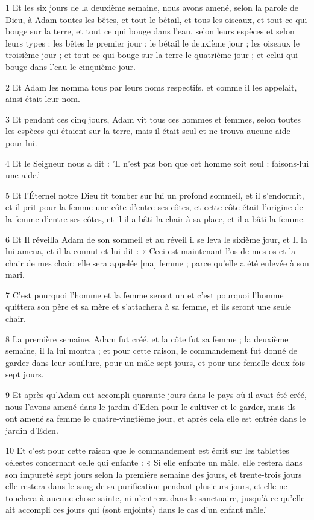 \par 1 Et les six jours de la deuxième semaine, nous avons amené, selon la parole de Dieu, à Adam toutes les bêtes, et tout le bétail, et tous les oiseaux, et tout ce qui bouge sur la terre, et tout ce qui bouge dans l'eau, selon leurs espèces et selon leurs types : les bêtes le premier jour ; le bétail le deuxième jour ; les oiseaux le troisième jour ; et tout ce qui bouge sur la terre le quatrième jour ; et celui qui bouge dans l'eau le cinquième jour.
\par 2 Et Adam les nomma tous par leurs noms respectifs, et comme il les appelait, ainsi était leur nom.
\par 3 Et pendant ces cinq jours, Adam vit tous ces hommes et femmes, selon toutes les espèces qui étaient sur la terre, mais il était seul et ne trouva aucune aide pour lui.
\par 4 Et le Seigneur nous a dit : 'Il n'est pas bon que cet homme soit seul : faisons-lui une aide.'
\par 5 Et l'Éternel notre Dieu fit tomber sur lui un profond sommeil, et il s'endormit, et il prit pour la femme une côte d'entre ses côtes, et cette côte était l'origine de la femme d'entre ses côtes, et il il a bâti la chair à sa place, et il a bâti la femme.
\par 6 Et Il réveilla Adam de son sommeil et au réveil il se leva le sixième jour, et Il la lui amena, et il la connut et lui dit : « Ceci est maintenant l'os de mes os et la chair de mes chair; elle sera appelée [ma] femme ; parce qu'elle a été enlevée à son mari.
\par 7 C'est pourquoi l'homme et la femme seront un et c'est pourquoi l'homme quittera son père et sa mère et s'attachera à sa femme, et ils seront une seule chair.
\par 8 La première semaine, Adam fut créé, et la côte fut sa femme ; la deuxième semaine, il la lui montra ; et pour cette raison, le commandement fut donné de garder dans leur souillure, pour un mâle sept jours, et pour une femelle deux fois sept jours.
\par 9 Et après qu'Adam eut accompli quarante jours dans le pays où il avait été créé, nous l'avons amené dans le jardin d'Eden pour le cultiver et le garder, mais ils ont amené sa femme le quatre-vingtième jour, et après cela elle est entrée dans le jardin d'Eden.
\par 10 Et c'est pour cette raison que le commandement est écrit sur les tablettes célestes concernant celle qui enfante : « Si elle enfante un mâle, elle restera dans son impureté sept jours selon la première semaine des jours, et trente-trois jours elle restera dans le sang de sa purification pendant plusieurs jours, et elle ne touchera à aucune chose sainte, ni n'entrera dans le sanctuaire, jusqu'à ce qu'elle ait accompli ces jours qui (sont enjoints) dans le cas d'un enfant mâle.'
